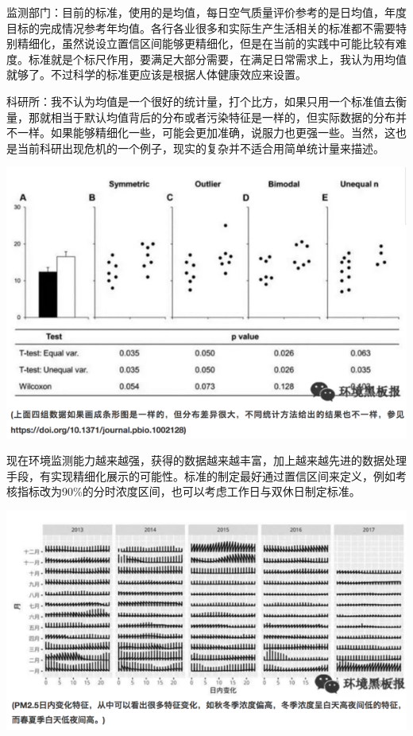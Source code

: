 \documentclass[
]{book}
\begin{document}
监测部门：目前的标准，使用的是均值，每日空气质量评价参考的是日均值，年度目标的完成情况参考年均值。各行各业很多和实际生产生活相关的标准都不需要特别精细化，虽然说设立置信区间能够更精细化，但是在当前的实践中可能比较有难度。标准就是个标尺作用，要满足大部分需要，在满足日常需求上，我认为用均值就够了。不过科学的标准更应该是根据人体健康效应来设置。

科研所：我不认为均值是一个很好的统计量，打个比方，如果只用一个标准值去衡量，那就相当于默认均值背后的分布或者污染特征是一样的，但实际数据的分布并不一样。如果能够精细化一些，可能会更加准确，说服力也更强一些。当然，这也是当前科研出现危机的一个例子，现实的复杂并不适合用简单统计量来描述。

\includegraphics[width=8.33in]{images/air3}

现在环境监测能力越来越强，获得的数据越来越丰富，加上越来越先进的数据处理手段，有实现精细化展示的可能性。标准的制定最好通过置信区间来定义，例如考核指标改为90\%的分时浓度区间，也可以考虑工作日与双休日制定标准。

\includegraphics[width=8.33in]{images/air4}
\end{document}

